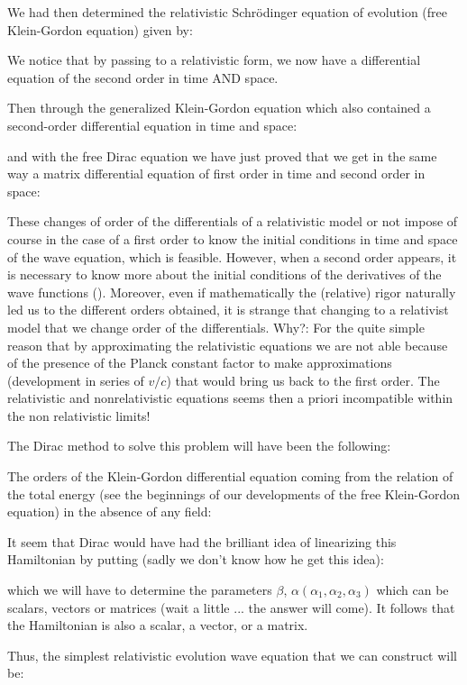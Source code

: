 	We had then determined the relativistic Schrödinger equation of evolution (free Klein-Gordon equation) given by:
	
	We notice that by passing to a relativistic form, we now have a differential equation of the second order in time AND space.

	Then through the generalized Klein-Gordon equation which also contained a second-order differential equation in time and space:
	
	and with the free Dirac equation we have just proved that we get in the same way a matrix differential equation of first order in time and second order in space:
	
	These changes of order of the differentials of a relativistic model or not impose of course in the case of a first order to know the initial conditions in time and space of the wave equation, which is feasible. However, when a second order appears, it is necessary to know more about the initial conditions of the derivatives of the wave functions (). Moreover, even if mathematically the (relative) rigor naturally led us to the different orders obtained, it is strange that changing to a relativist model that we change order of the differentials. Why?: For the quite simple reason that by approximating the relativistic equations we are not able because of the presence of the Planck constant factor to make approximations (development in series of $v/c$) that would bring us back to the first order. The relativistic and nonrelativistic equations seems then a priori incompatible within the non relativistic limits!
	
	The Dirac method to solve this problem will have been the following:

	The orders of the Klein-Gordon differential equation coming from the relation  of the total energy (see the beginnings of our developments of the free Klein-Gordon equation) in the absence of any field:
	
	It seem that Dirac would have had the brilliant idea of linearizing this Hamiltonian by putting (sadly we don't know how he get this idea):
	
	which we will have to determine the parameters $\beta$, $\alpha(\alpha_1,\alpha_2,\alpha_3)$ which can be scalars, vectors or matrices (wait a little ... the answer will come). It follows that the Hamiltonian is also a scalar, a vector, or a matrix.

	Thus, the simplest relativistic evolution wave equation that we can construct will be:
	

